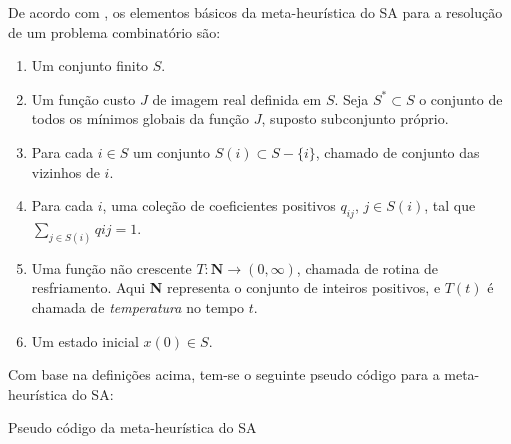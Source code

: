 De acordo com \cite{bertsimas1993simulated}, os elementos básicos da meta-heurística do SA
para a resolução de um problema combinatório são:

\begin{enumerate}
 \item Um conjunto finito $S$.
 \item Um função custo $J$ de imagem real definida em $S$. Seja $S^* \subset S$ o conjunto de todos os mínimos globais da
 função $J$, suposto subconjunto próprio.
 \item Para cada $i \in S$ um conjunto $S(i) \subset S - \{i\}$, chamado de conjunto das vizinhos de $i$.
 \item Para cada $i$, uma coleção de coeficientes positivos $q_{ij}$, $j \in S(i)$, tal que $\sum_{j \in S(i)} q{ij} = 1$.
 \item Uma função não crescente $T: \textbf{N} \rightarrow (0,\infty)$, chamada de rotina de resfriamento. Aqui \textbf{N}
 representa o conjunto de inteiros positivos, e $T(t)$ é chamada de \textit{temperatura} no tempo $t$.
 \item Um estado inicial $x(0) \in S$.
\end{enumerate}

Com base na definições acima, tem-se o seguinte pseudo código para a meta-heurística do SA:

\begin{algorithm}[H]


\caption{Pseudo código da meta-heurística do SA\label{lst:meta-heuristica_sa}}
\end{algorithm}

